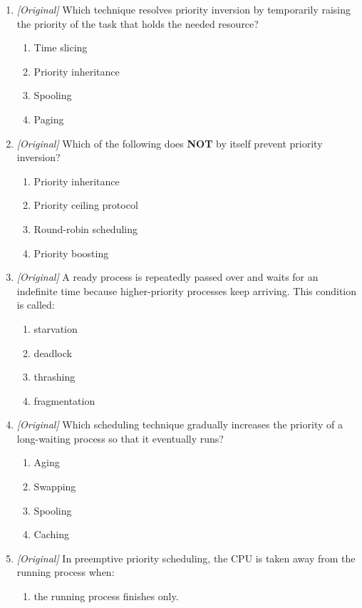 \documentclass[11pt]{article}
\begin{document}
\begin{enumerate}[label=\textbf{Q\arabic*.}, leftmargin=*]
\item \textit{[Original]} Which technique resolves priority inversion by
  temporarily raising the priority of the task that holds the needed
  resource?
  \begin{enumerate}[label=\Alph*.]
    \item Time slicing
    \item Priority inheritance
    \item Spooling
    \item Paging
  \end{enumerate}
\item \textit{[Original]} Which of the following does \textbf{NOT} by itself
  prevent priority inversion?
  \begin{enumerate}[label=\Alph*.]
    \item Priority inheritance
    \item Priority ceiling protocol
    \item Round-robin scheduling
    \item Priority boosting
  \end{enumerate}
\item \textit{[Original]} A ready process is repeatedly passed over and waits
  for an indefinite time because higher-priority processes keep arriving.
  This condition is called:
  \begin{enumerate}[label=\Alph*.]
    \item starvation
    \item deadlock
    \item thrashing
    \item fragmentation
  \end{enumerate}
\item \textit{[Original]} Which scheduling technique gradually increases the
  priority of a long-waiting process so that it eventually runs?
  \begin{enumerate}[label=\Alph*.]
    \item Aging
    \item Swapping
    \item Spooling
    \item Caching
  \end{enumerate}
\item \textit{[Original]} In preemptive priority scheduling, the CPU is taken
  away from the running process when:
  \begin{enumerate}[label=\Alph*.]
    \item the running process finishes only.

\end{enumerate}
\end{enumerate}
\end{document}

